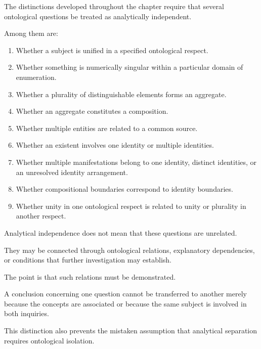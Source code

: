 The distinctions developed
throughout the chapter require
that several ontological questions
be treated as analytically
independent.

Among them are:

\begin{enumerate}
    \item Whether a subject is unified
    in a specified ontological respect.

    \item Whether something is
    numerically singular within
    a particular domain of enumeration.

    \item Whether a plurality of
    distinguishable elements forms
    an aggregate.

    \item Whether an aggregate
    constitutes a composition.

    \item Whether multiple entities
    are related to a common source.

    \item Whether an existent involves
    one identity or multiple identities.

    \item Whether multiple manifestations
    belong to one identity, distinct
    identities, or an unresolved
    identity arrangement.

    \item Whether compositional
    boundaries correspond to
    identity boundaries.

    \item Whether unity in one
    ontological respect is related
    to unity or plurality in
    another respect.
\end{enumerate}

Analytical independence does
not mean that these questions
are unrelated.

They may be connected through
ontological relations, explanatory
dependencies, or conditions
that further investigation
may establish.

The point is that such relations
must be demonstrated.

A conclusion concerning one
question cannot be transferred
to another merely because
the concepts are associated
or because the same subject
is involved in both inquiries.

This distinction also prevents
the mistaken assumption that
analytical separation requires
ontological isolation.

